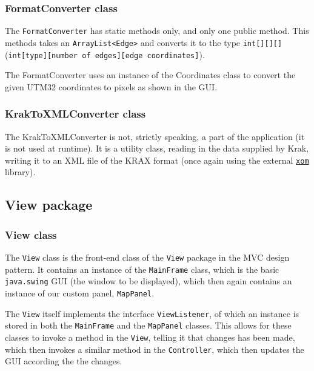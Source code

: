 \documentclass[a4paper,11pt]{article}
\begin{document}
\subsubsection{FormatConverter class} %
The \texttt{FormatConverter} has static methods only, and only one public method. This methods takes an \texttt{ArrayList<Edge>} and converts it to the type \texttt{int[][][]} \\(\texttt{int[type][number of edges][edge coordinates]}).

The FormatConverter uses an instance of the Coordinates class to convert the given UTM32 coordinates to pixels as shown in the GUI.

\subsubsection{KrakToXMLConverter class} %
The KrakToXMLConverter is not, strictly speaking, a part of the application (it is not used at runtime). It is a utility class, reading in the data supplied by Krak, writing it to an XML file of the KRAX format (once again using the external \href{www.xom.nu}{\texttt{xom}} library).

\subsection{View package} %

\subsubsection{View class} %
The \texttt{View} class is the front-end class of the \texttt{View} package in the MVC design pattern. It contains an instance of the \texttt{MainFrame} class, which is the basic \texttt{java.swing} GUI (the window to be displayed), which then again contains an instance of our custom panel, \texttt{MapPanel}.

The \texttt{View} itself implements the interface \texttt{ViewListener}, of which an instance is stored in both the \texttt{MainFrame} and the \texttt{MapPanel} classes. This allows for these classes to invoke a method in the \texttt{View}, telling it that changes has been made, which then invokes a similar method in the \texttt{Controller}, which then updates the GUI according the the changes.
\end{document}
